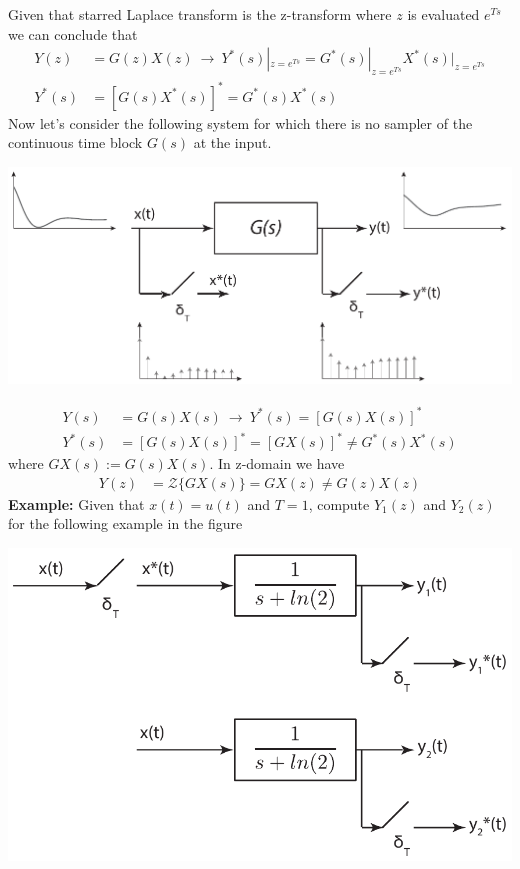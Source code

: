 \documentclass[twoside]{article}
\begin{document}
%
Given that starred Laplace transform is the z-transform where $z$ is evaluated 
$e^{Ts}$ we can conclude that
%
\begin{align*}
Y(z) &= G(z) X(z) \ \rightarrow \ Y^*(s)|_{z= e^{Ts}} =
       G^*(s)|_{z=e^{Ts}} X^*(s)|_{z= e^{Ts}}
\\
Y^*(s) &= \left[ G(s) X^*(s) \right]^* = G^*(s) X^*(s)
\end{align*}
%
Now let's consider the following system for which there is no sampler
of the continuous time block $G(s)$ at the input.
%
    \begin{center}
\begin{minipage}[h]{0.75\linewidth}
    \begin{center}
      \includegraphics[width=\textwidth]{sys2}
    \end{center}
\end{minipage}
    \end{center}
%
\begin{align*}
Y(s) &= G(s) X(s) \ \rightarrow \ Y^*(s) = \left[ G(s) X(s) \right]^*
\\
Y^*(s) &= \left[ G(s) X(s) \right]^* = \left[ GX(s) \right]^* \neq G^*(s) X^*(s)
\end{align*}
%
where $GX(s) := G(s) X(s)$. In z-domain we have 
%
\begin{align*}
Y(z) &= \mathcal{Z} \lbrace GX(s) \rbrace = GX(z) \neq G(z) X(z)
\end{align*}
%
\textbf{Example:} Given that $x(t) = u(t)$ and $T=1$, compute $Y_1(z)$ and
$Y_2(z)$ for the following example in the figure
%
    \begin{center}
\begin{minipage}[h]{0.6\linewidth}
    \begin{center}
      \includegraphics[width=\textwidth]{example1}
    \end{center}
\end{minipage}
    \end{center}
\end{document}
